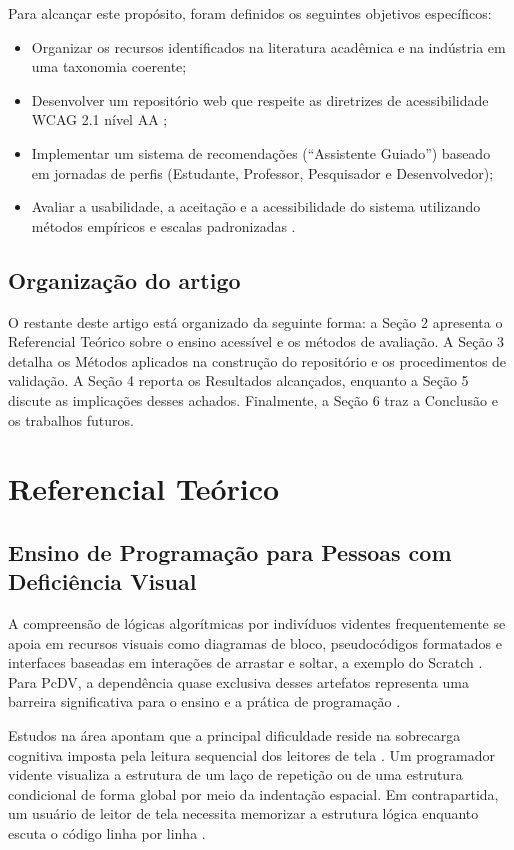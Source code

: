 \documentclass[12pt]{article}
\begin{document}
Para alcançar este propósito, foram definidos os seguintes objetivos específicos:
\begin{itemize}
    \item Organizar os recursos identificados na literatura acadêmica e na indústria em uma taxonomia coerente;
    \item Desenvolver um repositório web que respeite as diretrizes de acessibilidade WCAG 2.1 nível AA \cite{wcag21};
    \item Implementar um sistema de recomendações (``Assistente Guiado'') baseado em jornadas de perfis (Estudante, Professor, Pesquisador e Desenvolvedor);
    \item Avaliar a usabilidade, a aceitação e a acessibilidade do sistema utilizando métodos empíricos e escalas padronizadas \cite{brooke1996sus, davis1989tam}.
\end{itemize}

\subsection{Organização do artigo}
O restante deste artigo está organizado da seguinte forma: a Seção 2 apresenta o Referencial Teórico sobre o ensino acessível e os métodos de avaliação. A Seção 3 detalha os Métodos aplicados na construção do repositório e os procedimentos de validação. A Seção 4 reporta os Resultados alcançados, enquanto a Seção 5 discute as implicações desses achados. Finalmente, a Seção 6 traz a Conclusão e os trabalhos futuros.

\section{Referencial Teórico} \label{sec:referencial}

\subsection{Ensino de Programação para Pessoas com Deficiência Visual}
A compreensão de lógicas algorítmicas por indivíduos videntes frequentemente se apoia em recursos visuais como diagramas de bloco, pseudocódigos formatados e interfaces baseadas em interações de arrastar e soltar, a exemplo do Scratch \cite{resnick2009scratch}. Para PcDV, a dependência quase exclusiva desses artefatos representa uma barreira significativa para o ensino e a prática de programação \cite{hadwen2018making}.

Estudos na área apontam que a principal dificuldade reside na sobrecarga cognitiva imposta pela leitura sequencial dos leitores de tela \cite{baker2015structjumper}. Um programador vidente visualiza a estrutura de um laço de repetição ou de uma estrutura condicional de forma global por meio da indentação espacial. Em contrapartida, um usuário de leitor de tela necessita memorizar a estrutura lógica enquanto escuta o código linha por linha \cite{baker2019educational}.
\end{document}
